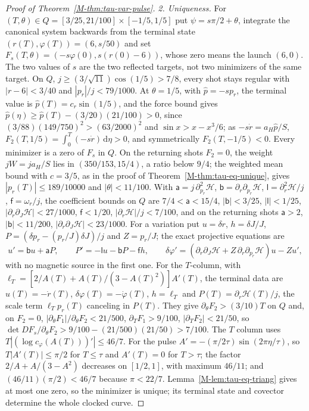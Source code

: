 \documentclass[aip,jmp,amsmath,amssymb,reprint]{revtex4-2}
\newcommand{\dd}{\mathrm{d}}
\theoremstyle{plain}
\theoremstyle{definition}
\begin{document}
\begin{proof}[Proof of Theorem~\ref{M-thm:tau-var-pulse}]
\emph{2. Uniqueness.} For $(T,\theta)\in Q=[3/25,21/100]\times[-1/5,1/5]$ put $\psi=s\pi/2+\theta$, integrate
the canonical system backwards from the terminal state $(r(T),\varphi(T))=(6,s/50)$ and set
$F_s(T,\theta)=(-s\varphi(0),s(r(0)-6))$, whose zero means the launch $(6,0)$. The two values of $s$ are the
two reflected targets, not two minimizers of the same target. On $Q$,
$j\ge(3/\sqrt{11})\cos(1/5)>7/8$, every shot stays regular with $|r-6|<3/40$ and $|p_r|/j<79/1000$. At $\theta=1/5$, with $\hat p=-sp_r$, the
terminal value is $\hat p(T)=c_r\sin(1/5)$, and the force bound gives $\hat p(\eta)\ge\hat p(T)-(3/20)(21/100)>0$,
since $(3/88)(149/750)^2>(63/2000)^2$ and $\sin x>x-x^3/6$; as $-s\dot r=a_H\hat p/S$,
$F_2(T,1/5)=\int_0^T(-s\dot r)\,\dd\eta>0$, and symmetrically $F_2(T,-1/5)<0$. Every minimizer is a zero of $F_s$ in $Q$. On the returning shots
$F_2=0$, the weight $jW=ja_H/S$ lies in $(350/153,15/4)$, a ratio below $9/4$; the weighted mean
bound with $c=3/5$, as in the proof of Theorem~\ref{M-thm:tau-eq-unique}, gives $|p_r(T)|\le189/10000$ and
$|\theta|<11/100$. With $\mathsf a=j\,\partial^2_{p_r}\mathcal H$, $\mathsf b=\partial_r\partial_{p_r}\mathcal H$,
$\mathsf l=\partial_r^2\mathcal H/j$, $\mathsf f=\omega_r/j$, the coefficient bounds on $Q$ are
$7/4<\mathsf a<15/4$, $|\mathsf b|<3/25$, $|\mathsf l|<1/25$, $|\partial_r\partial_J\mathcal H|<27/1000$,
$\mathsf f<1/20$, $|\partial_r\mathcal H|/j<7/100$, and on the returning shots $\mathsf a>2$, $|\mathsf b|<11/200$,
$|\partial_r\partial_J\mathcal H|<23/1000$. For a variation put $u=\delta r$, $h=\delta J/J$,
$P=(\delta p_r-(p_r/J)\delta J)/j$ and $Z=p_r/J$; the exact projective equations are
\[
 u'=\mathsf bu+\mathsf aP,\qquad P'=-\mathsf lu-\mathsf bP-\mathsf fh,\qquad
 \delta\varphi'=(\partial_r\partial_J\mathcal H+Z\,\partial_r\partial_{p_r}\mathcal H)u-Zu',
\]
with no magnetic source in the first one. For the $T$-column, with
$\ell_T=[2/A(T)+A(T)/(3-A(T)^2)]A'(T)$, the terminal data are $u(T)=-\dot r(T)$,
$\delta\varphi(T)=-\dot\varphi(T)$, $h=\ell_T$ and $P(T)=\partial_r\mathcal H(T)/j$, the scale term $\ell_Tp_r(T)$
canceling in $P(T)$. They give $\partial_\theta F_2>(3/10)T$ on $Q$ and, on $F_2=0$,
$|\partial_\theta F_1|/\partial_\theta F_2<21/500$, $\partial_TF_1>9/100$, $|\partial_TF_2|<21/50$, so
$\det DF_s/\partial_\theta F_2>9/100-(21/500)(21/50)>7/100$. The $T$ column uses $T|(\log c_\varphi(A(T)))'|\le46/7$. For the pulse $A'=-(\pi/2\tau)\sin(2\pi\eta/\tau)$, so
$T|A'(T)|\le\pi/2$ for $T\le\tau$ and $A'(T)=0$ for $T>\tau$; the factor $2/A+A/(3-A^2)$ decreases on $[1/2,1]$,
with maximum $46/11$; and $(46/11)(\pi/2)<46/7$ because $\pi<22/7$. Lemma~\ref{M-lem:tau-eq-triang} gives at
most one zero, so the minimizer is unique; its terminal state and covector determine the whole
clocked curve.


\end{proof}
\end{document}
